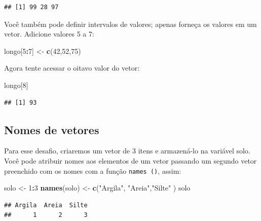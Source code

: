 \documentclass[]{book}
\newenvironment{Shaded}{\begin{snugshade}}{\end{snugshade}}
\newcommand{\DecValTok}[1]{\textcolor[rgb]{0.00,0.00,0.81}{#1}}
\newcommand{\KeywordTok}[1]{\textcolor[rgb]{0.13,0.29,0.53}{\textbf{#1}}}
\newcommand{\NormalTok}[1]{#1}
\newcommand{\OperatorTok}[1]{\textcolor[rgb]{0.81,0.36,0.00}{\textbf{#1}}}
\newcommand{\StringTok}[1]{\textcolor[rgb]{0.31,0.60,0.02}{#1}}
\begin{document}
\begin{verbatim}
## [1] 99 28 97
\end{verbatim}

Você também pode definir intervalos de valores; apenas forneça os valores em um vetor. Adicione valores 5 a 7:

\begin{Shaded}
\begin{Highlighting}[]
\NormalTok{longo[}\DecValTok{5}\OperatorTok{:}\DecValTok{7}\NormalTok{] <-}\StringTok{ }\KeywordTok{c}\NormalTok{(}\DecValTok{42}\NormalTok{,}\DecValTok{52}\NormalTok{,}\DecValTok{75}\NormalTok{)}
\end{Highlighting}
\end{Shaded}

Agora tente acessar o oitavo valor do vetor:

\begin{Shaded}
\begin{Highlighting}[]
\NormalTok{longo[}\DecValTok{8}\NormalTok{]}
\end{Highlighting}
\end{Shaded}

\begin{verbatim}
## [1] 93
\end{verbatim}

\hypertarget{nomes-de-vetores}{%
\subsection{Nomes de vetores}\label{nomes-de-vetores}}

Para esse desafio, criaremos um vetor de 3 itens e armazená-lo na variável solo.
Você pode atribuir nomes aos elementos de um vetor passando um segundo vetor preenchido com os nomes com a função \texttt{names\ ()}, assim:

\begin{Shaded}
\begin{Highlighting}[]
\NormalTok{solo <-}\StringTok{ }\DecValTok{1}\OperatorTok{:}\DecValTok{3}
\KeywordTok{names}\NormalTok{(solo) <-}\StringTok{ }\KeywordTok{c}\NormalTok{(}\StringTok{"Argila"}\NormalTok{, }\StringTok{"Areia"}\NormalTok{,}\StringTok{"Silte"}\NormalTok{ )}
\NormalTok{solo}
\end{Highlighting}
\end{Shaded}

\begin{verbatim}
## Argila  Areia  Silte 
##      1      2      3
\end{verbatim}
\end{document}
